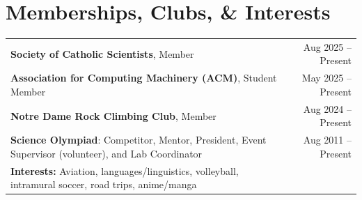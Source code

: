 \documentclass[letterpaper,11pt]{article}
\begin{document}
\section{Memberships, Clubs, \& Interests}
  \begin{small}
    \begin{tabularx}{\textwidth}{@{} X r @{}}
      \textbf{Society of Catholic Scientists}, Member & Aug 2025 -- Present \\
      \textbf{Association for Computing Machinery (ACM)}, Student Member & May 2025 -- Present \\
      \textbf{Notre Dame Rock Climbing Club}, Member & Aug 2024 -- Present \\
      \textbf{Science Olympiad}: Competitor, Mentor, President, Event Supervisor (volunteer), and Lab Coordinator & Aug 2011 -- Present \\
      \textbf{Interests:} Aviation, languages/linguistics, volleyball, intramural soccer, road trips, anime/manga & \\
    \end{tabularx}
  \end{small}
\end{document}
